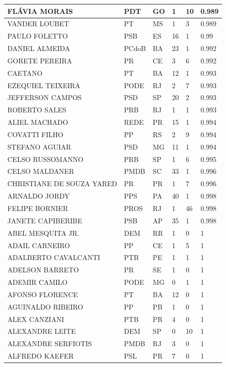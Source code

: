 \begin{apendicesenv}
\begin{longtable}{|L{4cm}|C{2cm}|C{1cm}|C{2cm}|C{1cm}|C{2cm}|}
FLÁVIA MORAIS & PDT & GO & 1 & 10 & 0.989 \\ \hline
VANDER LOUBET & PT & MS & 1 & 3 & 0.989 \\ \hline
PAULO FOLETTO & PSB & ES & 16 & 1 & 0.99 \\ \hline
DANIEL ALMEIDA & PCdoB & BA & 23 & 1 & 0.992 \\ \hline
GORETE PEREIRA & PR & CE & 3 & 6 & 0.992 \\ \hline
CAETANO & PT & BA & 12 & 1 & 0.993 \\ \hline
EZEQUIEL TEIXEIRA & PODE & RJ & 2 & 7 & 0.993 \\ \hline
JEFFERSON CAMPOS & PSD & SP & 20 & 2 & 0.993 \\ \hline
ROBERTO SALES & PRB & RJ & 1 & 1 & 0.993 \\ \hline
ALIEL MACHADO & REDE & PR & 15 & 1 & 0.994 \\ \hline
COVATTI FILHO & PP & RS & 2 & 9 & 0.994 \\ \hline
STEFANO AGUIAR & PSD & MG & 11 & 1 & 0.994 \\ \hline
CELSO RUSSOMANNO & PRB & SP & 1 & 6 & 0.995 \\ \hline
CELSO MALDANER & PMDB & SC & 33 & 1 & 0.996 \\ \hline
CHRISTIANE DE SOUZA YARED & PR & PR & 1 & 7 & 0.996 \\ \hline
ARNALDO JORDY & PPS & PA & 40 & 1 & 0.998 \\ \hline
FELIPE BORNIER & PROS & RJ & 1 & 46 & 0.998 \\ \hline
JANETE CAPIBERIBE & PSB & AP & 35 & 1 & 0.998 \\ \hline
ABEL MESQUITA JR. & DEM & RR & 1 & 0 & 1 \\ \hline
ADAIL CARNEIRO & PP & CE & 1 & 5 & 1 \\ \hline
ADALBERTO CAVALCANTI & PTB & PE & 1 & 1 & 1 \\ \hline
ADELSON BARRETO & PR & SE & 1 & 0 & 1 \\ \hline
ADEMIR CAMILO & PODE & MG & 0 & 1 & 1 \\ \hline
AFONSO FLORENCE & PT & BA & 12 & 0 & 1 \\ \hline
AGUINALDO RIBEIRO & PP & PB & 1 & 0 & 1 \\ \hline
ALEX CANZIANI & PTB & PR & 4 & 0 & 1 \\ \hline
ALEXANDRE LEITE & DEM & SP & 0 & 10 & 1 \\ \hline
ALEXANDRE SERFIOTIS & PMDB & RJ & 3 & 0 & 1 \\ \hline
ALFREDO KAEFER & PSL & PR & 7 & 0 & 1 \\ \hline

\end{longtable}
\end{apendicesenv}
